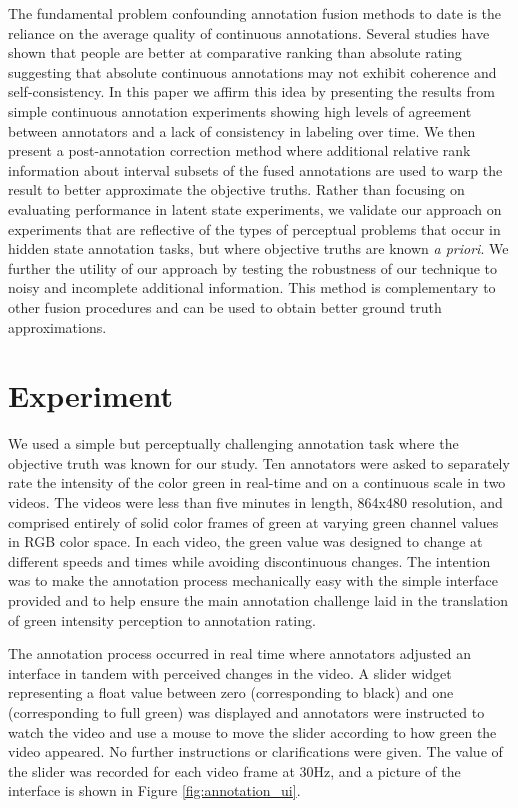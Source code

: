 \documentclass[times,twocolumn,final,authoryear]{elsarticle}
\begin{document}
The fundamental problem confounding annotation fusion methods to date is the reliance on the average quality of continuous annotations.  Several studies have shown that people are better at comparative ranking than absolute rating \citep{Yannakakis2011, metallinou2013annotation, yannakakis2015ratings} suggesting that absolute continuous annotations may not exhibit coherence and self-consistency.  In this paper we affirm this idea by presenting the results from simple continuous annotation experiments showing high levels of agreement between annotators and a lack of consistency in labeling over time.  We then present a post-annotation correction method where additional relative rank information about interval subsets of the fused annotations are used to warp the result to better approximate the objective truths.  Rather than focusing on evaluating performance in latent state experiments, we validate our approach on experiments that are reflective of the types of perceptual problems that occur in hidden state annotation tasks, but where objective truths are known \textit{a priori}.  We further the utility of our approach by testing the robustness of our technique to noisy and incomplete additional information. This method is complementary to other fusion procedures and can be used to obtain better ground truth approximations.

\section{Experiment}
We used a simple but perceptually challenging annotation task where the objective truth was known for our study.  Ten annotators were asked to separately rate the intensity of the color green in real-time and on a continuous scale in two videos.  The videos were less than five minutes in length, 864x480 resolution, and comprised entirely of solid color frames of green at varying green channel values in RGB color space.  In each video, the green value was designed to change at different speeds and times while avoiding discontinuous changes.  The intention was to make the annotation process mechanically easy with the simple interface provided and to help ensure the main annotation challenge laid in the translation of green intensity perception to annotation rating.

The annotation process occurred in real time where annotators adjusted an interface in tandem with perceived changes in the video.  A slider widget representing a float value between zero (corresponding to black) and one (corresponding to full green) was displayed and annotators were instructed to watch the video and use a mouse to move the slider according to how green the video appeared.  No further instructions or clarifications were given. The value of the slider was recorded for each video frame at 30Hz, and a picture of the interface is shown in Figure \ref{fig:annotation_ui}.
\end{document}
